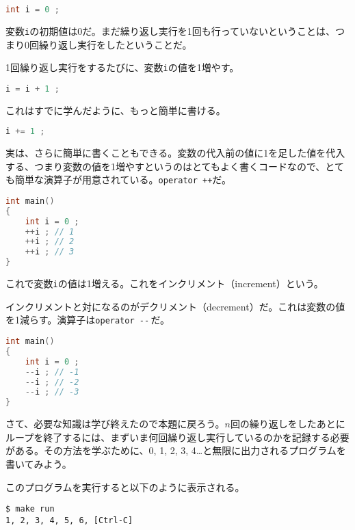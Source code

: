\begin{lstlisting}[language={C++}]
int i = 0 ;
\end{lstlisting}

変数\texttt{i}の初期値は0だ。まだ繰り返し実行を1回も行っていないということは、つまり0回繰り返し実行をしたということだ。

1回繰り返し実行をするたびに、変数\texttt{i}の値を1増やす。

\begin{lstlisting}[language={C++}]
i = i + 1 ;
\end{lstlisting}

これはすでに学んだように、もっと簡単に書ける。

\begin{lstlisting}[language={C++}]
i += 1 ;
\end{lstlisting}

実は、さらに簡単に書くこともできる。変数の代入前の値に1を足した値を代入する、つまり変数の値を1増やすというのはとてもよく書くコードなので、とても簡単な演算子が用意されている。\texttt{operator ++}だ。

\begin{lstlisting}[language={C++}]
int main()
{
    int i = 0 ;
    ++i ; // 1
    ++i ; // 2
    ++i ; // 3
}
\end{lstlisting}

これで変数\texttt{i}の値は1増える。これをインクリメント（increment）という。

インクリメントと対になるのがデクリメント（decrement）だ。これは変数の値を1減らす。演算子は\texttt{operator {-}{-}}\,だ。

\ifTombow\pagebreak\fi
\begin{lstlisting}[language={C++}]
int main()
{
    int i = 0 ;
    --i ; // -1
    --i ; // -2
    --i ; // -3
}
\end{lstlisting}

さて、必要な知識は学び終えたので本題に戻ろう。\(n\)回の繰り返しをしたあとにループを終了するには、まずいま何回繰り返し実行しているのかを記録する必要がある。その方法を学ぶために、0, 1, 2, 3, 4\ldots と無限に出力されるプログラムを書いてみよう。

このプログラムを実行すると以下のように表示される。

\begin{lstlisting}[style=terminal]
$ make run
1, 2, 3, 4, 5, 6, [Ctrl-C]
\end{lstlisting}

